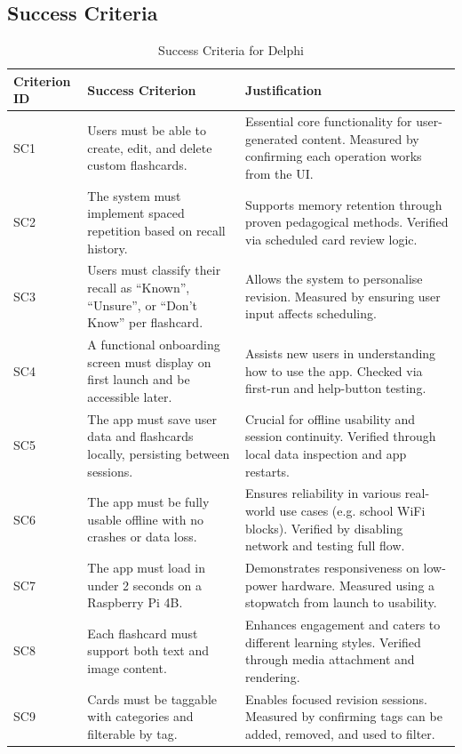 \documentclass[a4paper,12pt]{article}
\begin{document}
\subsection{Success Criteria}

\begin{table}[ht]
\centering
\caption{Success Criteria for Delphi}
\begin{tabularx}{\textwidth}{@{} p{} p{} X @{}}
\toprule
\textbf{Criterion ID} & \textbf{Success Criterion} & \textbf{Justification} \\
\midrule
SC1 & Users must be able to create, edit, and delete custom flashcards. & Essential core functionality for user-generated content. Measured by confirming each operation works from the UI. \\
SC2 & The system must implement spaced repetition based on recall history. & Supports memory retention through proven pedagogical methods. Verified via scheduled card review logic. \\
SC3 & Users must classify their recall as ``Known'', ``Unsure'', or ``Don’t Know'' per flashcard. & Allows the system to personalise revision. Measured by ensuring user input affects scheduling. \\
SC4 & A functional onboarding screen must display on first launch and be accessible later. & Assists new users in understanding how to use the app. Checked via first-run and help-button testing. \\
SC5 & The app must save user data and flashcards locally, persisting between sessions. & Crucial for offline usability and session continuity. Verified through local data inspection and app restarts. \\
SC6 & The app must be fully usable offline with no crashes or data loss. & Ensures reliability in various real-world use cases (e.g. school WiFi blocks). Verified by disabling network and testing full flow. \\
SC7 & The app must load in under 2 seconds on a Raspberry Pi 4B. & Demonstrates responsiveness on low-power hardware. Measured using a stopwatch from launch to usability. \\
SC8 & Each flashcard must support both text and image content. & Enhances engagement and caters to different learning styles. Verified through media attachment and rendering. \\
SC9 & Cards must be taggable with categories and filterable by tag. & Enables focused revision sessions. Measured by confirming tags can be added, removed, and used to filter. \\

\bottomrule
\end{tabularx}
\end{table}
\end{document}
